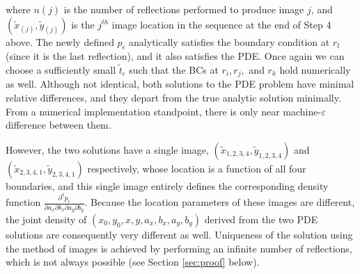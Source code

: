 where $n(j)$ is the number of reflections performed to produce image
$j$, and $(\tilde{x}_{(j)},\tilde{y}_{(j)})$ is the $j^{th}$ image
location in the sequence at the end of Step 4 above. The newly defined
$p_\epsilon$ analytically satisfies the boundary condition at $r_l$
(since it is the last reflection), and it also satisfies the PDE. Once
again we can choose a sufficiently small $\tilde{t}_\epsilon$ such
that the BCs at $r_i, r_j,$ and $r_k$ hold numerically as
well. Although not identical, both solutions to the PDE problem have
minimal relative differences, and they depart from the true
analytic solution minimally. From a numerical implementation
standpoint, there is only near machine-$\varepsilon$ difference
between them.


However, the two solutions have a single image,
$(\tilde{x}_{1,2,3,4}, \tilde{y}_{1,2,3,4})$ and
$(\tilde{x}_{2,3,4,1}, \tilde{y}_{2,3,4,1})$ respectively, whose
location is a function of all four boundaries, and this single image
entirely defines the corresponding density function
$\frac{\partial^4 p_\epsilon}{\partial a_x \partial b_x \partial a_y
  \partial b_y}$. Because the location parameters of these images are
different, the joint density of $(x_0, y_0, x, y, a_x, b_x, a_y, b_y)$
derived from the two PDE solutions are consequently very different as
well. Uniqueness of the solution using the method of images is
achieved by performing an infinite number of reflections, which is not
always possible (see Section \ref{sec:proof} below).

